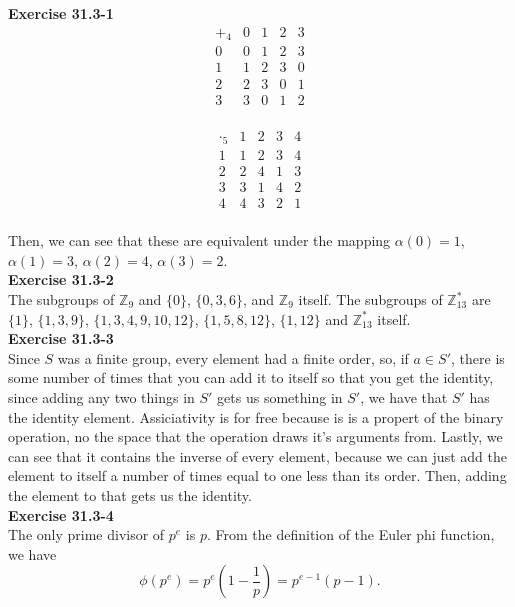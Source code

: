 \documentclass{article}
\begin{document}
\noindent\textbf{Exercise 31.3-1}\\

\[
\begin{array}{c|cccc}
+_4&0&1&2&3\\
\hline
0&0&1&2&3\\
1&1&2&3&0\\
2&2&3&0&1\\
3&3&0&1&2\\
\end{array}
\]

\[
\begin{array}{c|cccc}
\cdot_5&1&2&3&4\\
\hline
1&1&2&3&4\\
2&2&4&1&3\\
3&3&1&4&2\\
4&4&3&2&1\\
\end{array}
\]

Then, we can see that these are equivalent under the mapping $\alpha(0) =1$, $\alpha(1)= 3$, $\alpha(2) = 4$, $\alpha(3) =2$.\\

\noindent\textbf{Exercise 31.3-2}\\

The subgroups of $\mathbb{Z}_9$ and $\{0\}$, $\{0,3,6\}$, and $\mathbb{Z}_9$ itself.  The subgroups of $\mathbb{Z}_{13}^*$ are $\{ 1\}$, $\{1,3,9\}$, $\{1,3,4,9,10,12\}$, $\{1,5,8,12\}$, $\{1,12\}$ and $\mathbb{Z}_{13}^*$ itself. \\

\noindent\textbf{Exercise 31.3-3}\\

Since $S$ was a finite group, every element had a finite order, so, if $a\in S'$, there is some number of times that you can add it to itself so that you get the identity, since adding any two things in $S'$ gets us something in $S'$, we have that $S'$ has the identity element. Assiciativity is for free because is is a propert of the binary operation, no the space that the operation draws it's arguments from. Lastly, we can see that it contains the inverse of every element, because we can just add the element to itself a number of times equal to one less than its order. Then, adding the element to that gets us the identity.\\

\noindent\textbf{Exercise 31.3-4}\\

The only prime divisor of $p^e$ is $p$.  From the definition of the Euler phi function, we have
\[ \phi(p^e) = p^e\left(1-\frac{1}{p}\right) = p^{e-1}(p-1).\]
\end{document}
